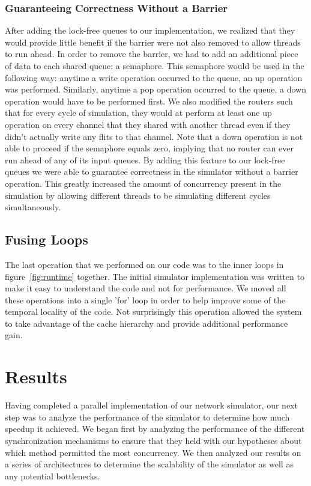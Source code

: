 \documentclass[twocolumn]{article}
\begin{document}
\subsubsection{Guaranteeing Correctness Without a Barrier}
After adding the lock-free queues to our implementation, we realized that
they would provide little benefit if the barrier were not also removed to
allow threads to run ahead.  In order to remove the barrier, we had to add
an additional piece of data to each shared queue: a semaphore.  This
semaphore would be used in the following way: anytime a write operation
occurred to the queue, an up operation was performed.  Similarly, anytime
a pop operation occurred to the queue, a down operation would have to be
performed first.  We also modified the routers such that for every cycle
of simulation, they would at perform at least one up operation on every
channel that they shared with another thread even if they didn't actually
write any flits to that channel.  Note that a down operation is not able
to proceed if the semaphore equals zero, implying that no router can ever
run ahead of any of its input queues.  By adding this feature to our
lock-free queues we were able to guarantee correctness in the simulator
without a barrier operation.  This greatly increased the amount of
concurrency present in the simulation by allowing different threads to be
simulating different cycles simultaneously.

\subsection{Fusing Loops}
The last operation that we performed on our code was to the inner loops in figure~\ref{fig:runtime} together.  The initial simulator implementation was written to make it
easy to understand the code and not for performance.  We moved all these operations into a single
'for' loop in order to help improve some of the temporal locality of the
code.  Not surprisingly this operation allowed the system to take
advantage of the cache hierarchy and provide additional performance gain.

\section{Results \label{results}}
Having completed a parallel implementation of our network simulator, our
next step was to analyze the performance of the simulator to determine how
much speedup it achieved.  We began first by analyzing the performance of
the different synchronization mechanisms to ensure that they held with our
hypotheses about which method permitted the most concurrency.  We then analyzed
our results on a series of architectures to determine the scalability of
the simulator as well as any potential bottlenecks.
\end{document}
